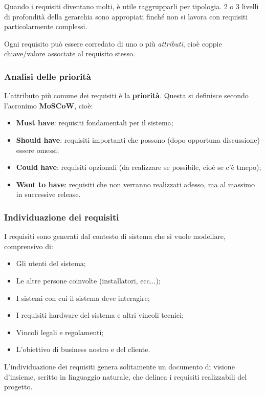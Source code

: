 \documentclass[a4paper,11pt]{article}
\begin{document}
Quando i requisiti diventano molti, è utile raggrupparli per tipologia. 2 o 3 livelli di profondità della gerarchia sono appropiati finché non si lavora con requisiti particolarmente complessi.

Ogni requisito può essere corredato di uno o più \textit{attributi}, cioè coppie chiave/valore associate al requisito stesso.

\subsubsection{Analisi delle priorità}
L'attributo più comune dei requisiti è la \textbf{priorità}. Questa si definisce secondo l'acronimo \textbf{MoSCoW}, cioè:
\begin{itemize}
	\item \textbf{Must have}: requisiti fondamentali per il sistema;
	\item \textbf{Should have}: requisiti importanti che possono (dopo opportuna discussione) essere omessi;
	\item \textbf{Could have}: requisiti opzionali (da realizzare se possibile, cioè se c'è tmepo);
	\item \textbf{Want to have}: requisiti che non verranno realizzati adesso, ma al massimo in successive release.
\end{itemize}

\subsubsection{Individuazione dei requisiti}
I requisiti sono generati dal contesto di sistema che si vuole modellare, comprensivo di:
\begin{itemize}
	\item Gli utenti del sistema;
	\item Le altre persone coinvolte (installatori, ecc...);
	\item I sistemi con cui il sistema deve interagire; 
	\item I requisiti hardware del sistema e altri vincoli tecnici;
	\item Vincoli legali e regolamenti;
	\item L'obiettivo di business nostro e del cliente.
\end{itemize}

L'individuazione dei requisiti genera solitamente un documento di visione d'insieme, scritto in linguaggio naturale, che delinea i requisiti realizzabili del progetto.
\end{document}
